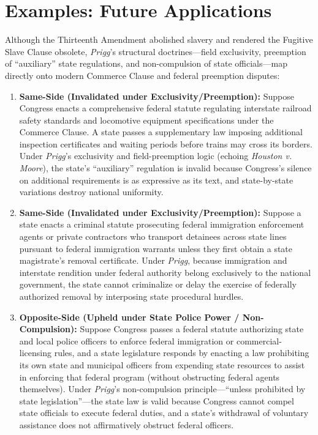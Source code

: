 \documentclass[12pt]{article}
\begin{document}
\section{Examples: Future Applications}
Although the Thirteenth Amendment abolished slavery and rendered the Fugitive Slave Clause obsolete, \textit{Prigg}'s structural doctrines---field exclusivity, preemption of ``auxiliary'' state regulations, and non-compulsion of state officials---map directly onto modern Commerce Clause and federal preemption disputes:
\begin{enumerate}
\item \textbf{Same-Side (Invalidated under Exclusivity/Preemption):} Suppose Congress enacts a comprehensive federal statute regulating interstate railroad safety standards and locomotive equipment specifications under the Commerce Clause. A state passes a supplementary law imposing additional inspection certificates and waiting periods before trains may cross its borders. Under \textit{Prigg}'s exclusivity and field-preemption logic (echoing \textit{Houston v. Moore}), the state's ``auxiliary'' regulation is invalid because Congress's silence on additional requirements is as expressive as its text, and state-by-state variations destroy national uniformity.
\item \textbf{Same-Side (Invalidated under Exclusivity/Preemption):} Suppose a state enacts a criminal statute prosecuting federal immigration enforcement agents or private contractors who transport detainees across state lines pursuant to federal immigration warrants unless they first obtain a state magistrate's removal certificate. Under \textit{Prigg}, because immigration and interstate rendition under federal authority belong exclusively to the national government, the state cannot criminalize or delay the exercise of federally authorized removal by interposing state procedural hurdles.
\item \textbf{Opposite-Side (Upheld under State Police Power / Non-Compulsion):} Suppose Congress passes a federal statute authorizing state and local police officers to enforce federal immigration or commercial-licensing rules, and a state legislature responds by enacting a law prohibiting its own state and municipal officers from expending state resources to assist in enforcing that federal program (without obstructing federal agents themselves). Under \textit{Prigg}'s non-compulsion principle---``unless prohibited by state legislation''---the state law is valid because Congress cannot compel state officials to execute federal duties, and a state's withdrawal of voluntary assistance does not affirmatively obstruct federal officers.

\end{enumerate}
\end{document}
